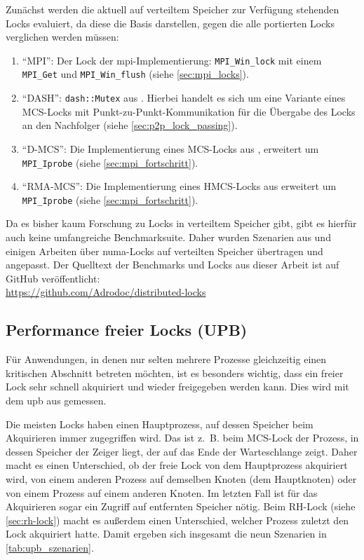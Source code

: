 Zunächst werden die aktuell auf verteiltem Speicher zur Verfügung stehenden Locks evaluiert,
da diese die Basis darstellen,
gegen die alle portierten Locks verglichen werden müssen:\begin{enumerate}
    \item \enquote{MPI}: Der Lock der \gls{mpi}-Implementierung: \texttt{MPI\_Win\_lock} mit einem \texttt{MPI\_Get} und \texttt{MPI\_Win\_flush} (siehe \autoref{sec:mpi_locks}).
    \item \enquote{DASH}: \texttt{dash::Mutex} aus \cite{DART-MPI}.
          Hierbei handelt es sich um eine Variante eines MCS-Locks mit Punkt-zu-Punkt-Kommunikation für die Übergabe des Locks an den Nachfolger (siehe \autoref{sec:p2p_lock_passing}).
    \item \enquote{D-MCS}: Die Implementierung eines MCS-Locks aus \cite{RMA-RW},
          erweitert um\\\texttt{MPI\_Iprobe} (siehe \autoref{sec:mpi_fortschritt}).
    \item \enquote{RMA-MCS}: Die Implementierung eines HMCS-Locks \cite{HMCS-Lock} aus \cite{RMA-RW} erweitert um \texttt{MPI\_Iprobe} (siehe \autoref{sec:mpi_fortschritt}).
\end{enumerate}
Da es bisher kaum Forschung zu Locks in verteiltem Speicher gibt,
gibt es hierfür auch keine umfangreiche Benchmarksuite.
Daher wurden Szenarien aus \cite{RMA-RW} und einigen Arbeiten über \gls{numa}-Locks
auf verteilten Speicher übertragen und angepasst.
Der Quelltext der Benchmarks und Locks aus dieser Arbeit ist auf GitHub veröffentlicht:\\
\url{https://github.com/Adrodoc/distributed-locks}

\subsection{Performance freier Locks (UPB)}
\label{sec:upb}

Für Anwendungen,
in denen nur selten mehrere Prozesse gleichzeitig einen kritischen Abschnitt betreten möchten,
ist es besonders wichtig,
dass ein freier Lock sehr schnell akquiriert und wieder freigegeben werden kann.
Dies wird mit dem \gls{upb} aus \cite{RH-Lock} gemessen.

Die meisten Locks haben einen Hauptprozess,
auf dessen Speicher beim Akquirieren immer zugegriffen wird.
Das ist z.~B. beim MCS-Lock der Prozess,
in dessen Speicher der Zeiger liegt,
der auf das Ende der Warteschlange zeigt.
Daher macht es einen Unterschied,
ob der freie Lock von dem Hauptprozess akquiriert wird,
von einem anderen Prozess auf demselben Knoten (dem Hauptknoten)
oder von einem Prozess auf einem anderen Knoten.
Im letzten Fall ist für das Akquirieren sogar ein Zugriff auf entfernten Speicher nötig.
Beim RH-Lock (siehe \autoref{sec:rh-lock}) macht es außerdem einen Unterschied,
welcher Prozess zuletzt den Lock akquiriert hatte.
Damit ergeben sich insgesamt die neun Szenarien in \autoref{tab:upb_szenarien}.

